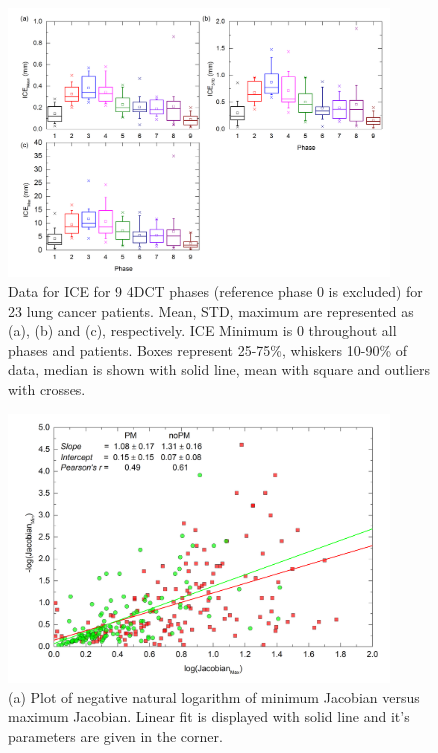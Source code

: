 \documentclass[type=dr, dr=rernat, accentcolor=tud7b,colorbacktitle, bigchapter, openright, twoside, 12pt ]{tudthesis}
\begin{document}
\begin{figure}[H]
	\begin{center}		
		\includegraphics[width=0.9\textwidth]{./Images/ICE_pigs.png}
		\caption{Data for ICE for 9 4DCT phases (reference phase 0 is excluded) for 23 lung cancer patients. Mean, STD, maximum are represented as (a), (b) and (c), respectively. ICE Minimum is 0 throughout all phases and patients.
		Boxes represent 25-75\%, whiskers 10-90\% of data, median is shown with solid line, mean with square and outliers with crosses.}
		\label{ice_pigs}
	\end{center}
\end{figure}

\begin{figure}[H]
	\begin{center}		
		\includegraphics[width=0.9\textwidth]{./Images/JacSum2.png}
		\caption{(a) Plot of negative natural logarithm of minimum Jacobian versus maximum Jacobian. Linear fit is displayed with solid line and it's parameters are given in the corner.}
		\label{calcJac_pigs}
	\end{center}
\end{figure}
\end{document}
